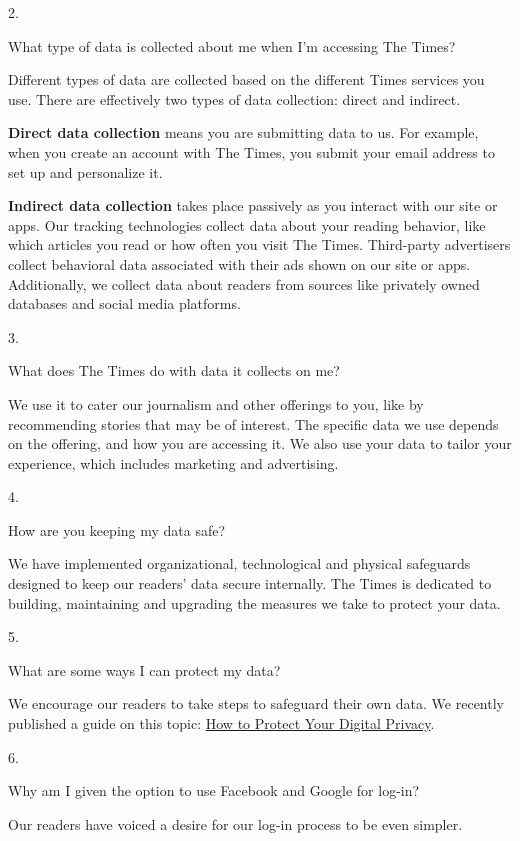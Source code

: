 2.

What type of data is collected about me when I'm accessing The Times?

Different types of data are collected based on the different Times
services you use. There are effectively two types of data collection:
direct and indirect.

\textbf{Direct data collection} means you are submitting data to us. For
example, when you create an account with The Times, you submit your
email address to set up and personalize it.

\textbf{Indirect data collection} takes place passively as you interact
with our site or apps. Our tracking technologies collect data about your
reading behavior, like which articles you read or how often you visit
The Times. Third-party advertisers collect behavioral data associated
with their ads shown on our site or apps. Additionally, we collect data
about readers from sources like privately owned databases and social
media platforms.

3.

What does The Times do with data it collects on me?

We use it to cater our journalism and other offerings to you, like by
recommending stories that may be of interest. The specific data we use
depends on the offering, and how you are accessing it. We also use your
data to tailor your experience, which includes marketing and
advertising.

4.

How are you keeping my data safe?

We have implemented organizational, technological and physical
safeguards designed to keep our readers' data secure internally. The
Times is dedicated to building, maintaining and upgrading the measures
we take to protect your data.

5.

What are some ways I can protect my data?

We encourage our readers to take steps to safeguard their own data. We
recently published a guide on this topic:
\href{https://www.nytimes3xbfgragh.onion/guides/privacy-project/how-to-protect-your-digital-privacy}{How
to Protect Your Digital Privacy}.

6.

Why am I given the option to use Facebook and Google for log-in?

Our readers have voiced a desire for our log-in process to be even
simpler.

